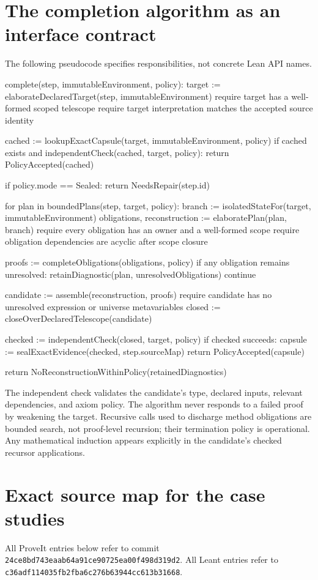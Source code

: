 \documentclass[11pt,a4paper]{article}
\theoremstyle{remark}
\newcommand{\pv}{24ce8bd743eaab64a91ce90725ea00f498d319d2}
\newcommand{\lv}{c36adf114035fb2fba6c276b63944cc613b31668}
\begin{document}
\section{The completion algorithm as an interface contract}\label{app:algorithm}
The following pseudocode specifies responsibilities, not concrete Lean API names.
\Needspace{418pt}
\begin{code}
complete(step, immutableEnvironment, policy):
  target := elaborateDeclaredTarget(step, immutableEnvironment)
  require target has a well-formed scoped telescope
  require target interpretation matches the accepted source identity

  cached := lookupExactCapsule(target, immutableEnvironment, policy)
  if cached exists and independentCheck(cached, target, policy):
    return PolicyAccepted(cached)

  if policy.mode == Sealed:
    return NeedsRepair(step.id)

  for plan in boundedPlans(step, target, policy):
    branch := isolatedStateFor(target, immutableEnvironment)
    obligations, reconstruction := elaboratePlan(plan, branch)
    require every obligation has an owner and a well-formed scope
    require obligation dependencies are acyclic after scope closure

    proofs := completeObligations(obligations, policy)
    if any obligation remains unresolved:
      retainDiagnostic(plan, unresolvedObligations)
      continue

    candidate := assemble(reconstruction, proofs)
    require candidate has no unresolved expression or universe metavariables
    closed := closeOverDeclaredTelescope(candidate)

    checked := independentCheck(closed, target, policy)
    if checked succeeds:
      capsule := sealExactEvidence(checked, step.sourceMap)
      return PolicyAccepted(capsule)

  return NoReconstructionWithinPolicy(retainedDiagnostics)
\end{code}
The independent check validates the candidate's type, declared inputs, relevant dependencies, and axiom policy. The algorithm never responds to a failed proof by weakening the target. Recursive calls used to discharge method obligations are bounded search, not proof-level recursion; their termination policy is operational. Any mathematical induction appears explicitly in the candidate's checked recursor applications.

\clearpage
\section{Exact source map for the case studies}\label{app:sourcemap}
\begingroup\raggedright
All ProveIt entries below refer to commit \texttt{\pv}. All Leant entries refer to \texttt{\lv}.
\end{document}
